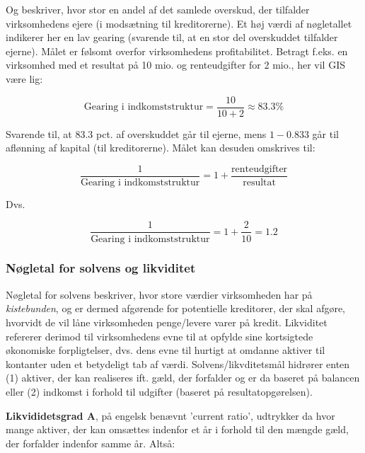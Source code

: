 \documentclass[10pt,reqno, usenames]{article}
\begin{document}
Og beskriver, hvor stor en andel af det samlede overskud, der tilfalder virksomhedens ejere (i modsætning til kreditorerne). Et høj værdi af nøgletallet indikerer her en lav gearing (svarende til, at en stor del overskuddet tilfalder ejerne). Målet er følsomt overfor virksomhedens profitabilitet. Betragt f.eks. en virksomhed med et resultat på 10 mio. og renteudgifter for 2 mio., her vil GIS være lig: 

\begin{equation}
        \text{Gearing i indkomststruktur} = \frac{10}{10+2} \approx 83.3 \% \nonumber 
\end{equation}

Svarende til, at 83.3 pct. af overskuddet går til ejerne, mens $1-0.833$ går til aflønning af kapital (til kreditorerne). Målet kan desuden omskrives til: 

\begin{equation}
        \frac{1}{\text{Gearing i indkomststruktur}} = 1 + \frac{\text{renteudgifter}}{\text{resultat}}
\end{equation}

Dvs. 

\begin{equation}
        \frac{1}{\text{Gearing i indkomststruktur}} = 1 + \frac{2}{10} = 1.2 \nonumber
\end{equation}

\subsubsection{Nøgletal for solvens og likviditet}
Nøgletal for solvens beskriver, hvor store værdier virksomheden har på \textit{kistebunden}, og er dermed afgørende for potentielle kreditorer, der skal afgøre, hvorvidt de vil låne virksomheden penge/levere varer på kredit. Likviditet refererer derimod til virksomhedens evne til at opfylde sine kortsigtede økonomiske forpligtelser, dvs. dens evne til hurtigt at omdanne aktiver til kontanter uden et betydeligt tab af værdi. Solvens/likvditetsmål hidrører enten (1) aktiver, der kan realiseres ift. gæld, der forfalder og er da baseret på balancen eller (2) indkomst i forhold til udgifter (baseret på resultatopgørelsen).  

\vspace{10 pt}

\textbf{Likvididetsgrad A}, på engelsk benævnt 'current ratio', udtrykker da hvor mange aktiver, der kan omsættes indenfor et år i forhold til den mængde gæld, der forfalder indenfor samme år. Altså:
\end{document}
